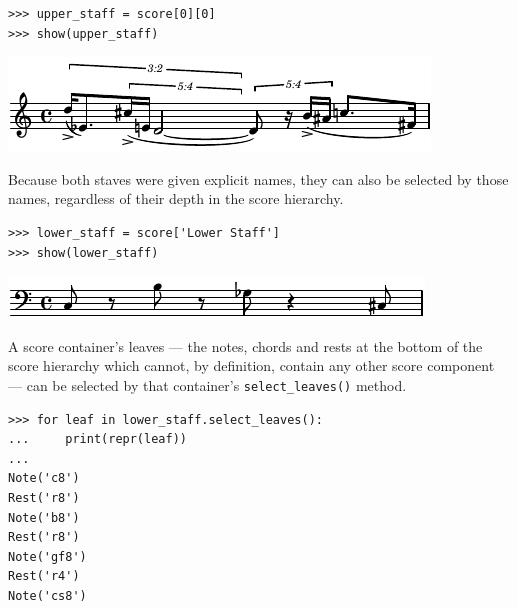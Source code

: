 \documentclass{article}
\begin{document}

\begin{lstlisting}
>>> upper_staff = score[0][0]
>>> show(upper_staff)
\end{lstlisting}
\includegraphics{assets/lilypond-9da0f4858f3377b553eae2208072c2bc.pdf}

Because both staves were given explicit names, they can also be selected by
those names, regardless of their depth in the score hierarchy.

\begin{lstlisting}
>>> lower_staff = score['Lower Staff']
>>> show(lower_staff)
\end{lstlisting}
\includegraphics{assets/lilypond-fa746e527d218a814e36af2f46d314bb.pdf}

A score container's leaves --- the notes, chords and rests at the bottom of the
score hierarchy which cannot, by definition, contain any other score component
--- can be selected by that container's \texttt{select\_leaves()} method.

\begin{lstlisting}
>>> for leaf in lower_staff.select_leaves():
...     print(repr(leaf))
...
Note('c8')
Rest('r8')
Note('b8')
Rest('r8')
Note('gf8')
Rest('r4')
Note('cs8')
\end{lstlisting}
\end{document}
